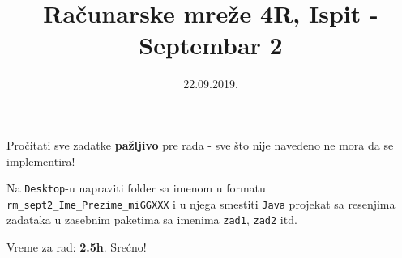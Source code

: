 \documentclass[]{article}
\title{Ra\v{c}unarske mre\v{z}e 4R, Ispit - Septembar 2}
\date{22.09.2019.}
\begin{document}
\makeatletter
\begin{center}

{\fontsize{12pt}{14pt}\selectfont\bfseries\@title\par}
\@date
\vspace{5mm}

Pro\v{c}itati sve zadatke \textbf{pa\v{z}ljivo} pre rada - sve \v{s}to nije navedeno ne mora da se implementira! 

Na \texttt{Desktop}-u napraviti folder sa imenom u formatu \texttt{rm\_sept2\_Ime\_Prezime\_miGGXXX} i u njega smestiti \texttt{Java} projekat sa resenjima zadataka u zasebnim paketima sa imenima \texttt{zad1}, \texttt{zad2} itd. 

Vreme za rad: \textbf{2.5h}. Sre\'{c}no!
\end{center}
\makeatother
\end{document}
